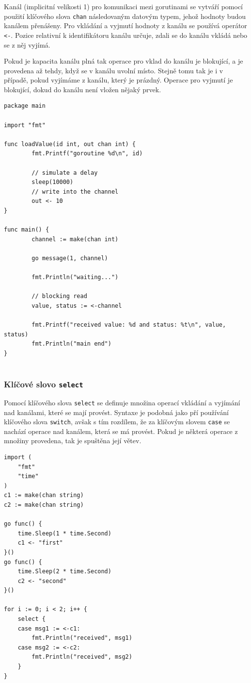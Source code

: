 \documentclass[12pt, a4paper]{article}
\begin{document}
Kanál (implicitní velikosti 1) pro komunikaci mezi gorutinami se vytváří pomocí použití klíčového slova \texttt{chan} následovaným datovým typem, jehož hodnoty budou kanálem přenášeny. Pro vkládání a vyjmutí hodnoty z kanálu se používá operátor \texttt{<-}. Pozice relativní k identifikátoru kanálu určuje, zdali se do kanálu vkládá nebo se z něj vyjímá.

Pokud je kapacita kanálu plná tak operace pro vklad do kanálu je blokující, a je provedena až tehdy, když se v kanálu uvolní místo. Stejně tomu tak je i v případě, pokud vyjímáme z kanálu, který je prázdný. Operace pro vyjmutí je blokující, dokud do kanálu není vložen nějaký prvek.

\begin{lstlisting}[caption={Ukázka využití kanálu}, captionpos=b, language=Golang]
package main
 
import "fmt"
 
func loadValue(id int, out chan int) {
        fmt.Printf("goroutine %d\n", id)
 
        // simulate a delay
        sleep(10000)
        // write into the channel 
        out <- 10
}
 
func main() {
        channel := make(chan int)
 
        go message(1, channel)
 
        fmt.Println("waiting...")
 
        // blocking read 
        value, status := <-channel
 
        fmt.Printf("received value: %d and status: %t\n", value, status)
        fmt.Println("main end")
}


\end{lstlisting}

\subsubsection{Klíčové slovo \texttt{select}}

Pomocí klíčového slova \texttt{select} se definuje množina operací vkládání a vyjímání nad kanálami, které se mají provést. Syntaxe je podobná jako pří používání klíčového slova \texttt{switch}, avšak s tím rozdílem, že za klíčovým slovem \texttt{case} se nachází operace nad kanálem, která se má provést. Pokud je některá operace z množiny provedena, tak je spuštěna její větev.


\begin{lstlisting}[caption={Klíčové slovo \texttt{select}}, captionpos=b, language=Golang]
import (
    "fmt"
    "time"
)
c1 := make(chan string)
c2 := make(chan string)

go func() {
    time.Sleep(1 * time.Second)
    c1 <- "first"
}()
go func() {
    time.Sleep(2 * time.Second)
    c2 <- "second"
}()

for i := 0; i < 2; i++ {
    select {
    case msg1 := <-c1:
        fmt.Println("received", msg1)
    case msg2 := <-c2:
        fmt.Println("received", msg2)
    }
}
\end{lstlisting}
\end{document}
